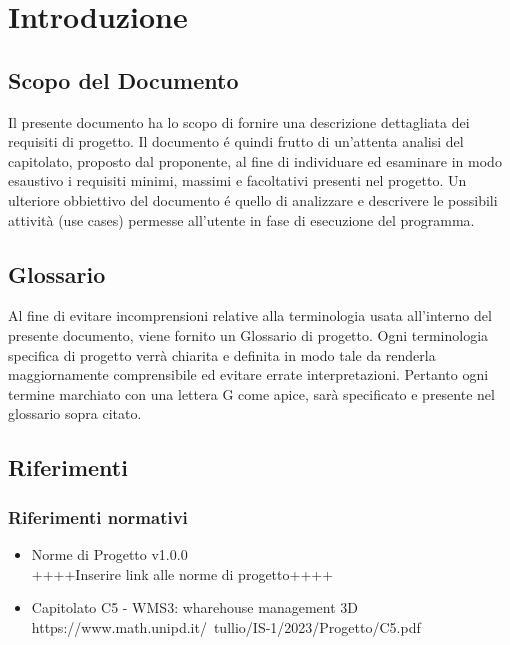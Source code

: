 \section{Introduzione}\label{sec:introduzione}

\subsection{Scopo del Documento}\label{sec:scopo_del_documento}
Il presente documento ha lo scopo di fornire una descrizione dettagliata dei requisiti di progetto. Il documento é quindi frutto di un'attenta analisi del capitolato, proposto dal proponente, al fine di individuare ed esaminare in modo esaustivo i requisiti minimi, massimi e facoltativi presenti nel progetto. 
Un ulteriore obbiettivo del documento é quello di analizzare e descrivere le possibili attività (use cases) permesse all'utente in fase di esecuzione del programma. 

\subsection{Glossario}\label{sec:glossario}

Al fine di evitare incomprensioni relative alla terminologia usata all’interno del presente documento, viene 
fornito un Glossario di progetto. Ogni terminologia specifica di progetto verrà chiarita e definita in modo tale 
da renderla maggiornamente comprensibile ed evitare errate interpretazioni. Pertanto ogni termine marchiato
con una lettera G come apice, sarà specificato e presente nel glossario sopra citato.

\subsection{Riferimenti}\label{sec:riferimenti}

\subsubsection{Riferimenti normativi}\label{sec:riferimenti_normativi}
\begin{itemize}
    \item Norme di Progetto v1.0.0 \\
    ++++Inserire link alle norme di progetto++++
    \item Capitolato C5 - WMS3: wharehouse management 3D \\
    https://www.math.unipd.it/~tullio/IS-1/2023/Progetto/C5.pdf
\end{itemize}

